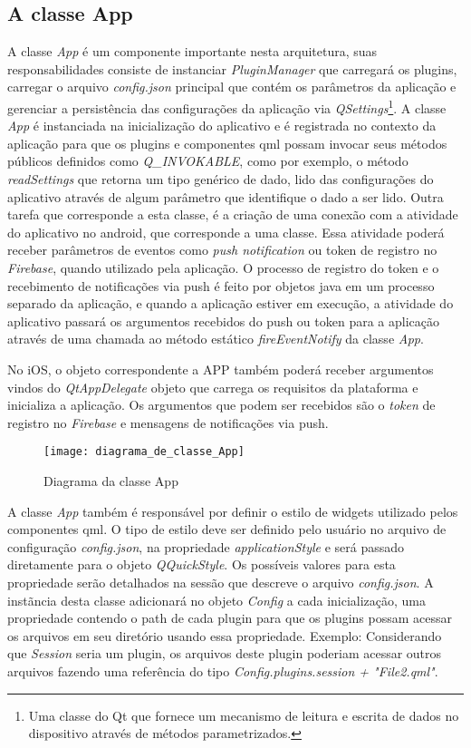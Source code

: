 \subsection{A classe App}\label{sec:solucao-desenvolvida}
A classe \textit{App} é um componente importante nesta arquitetura, suas responsabilidades consiste de instanciar \textit{PluginManager} que carregará os plugins, carregar o arquivo \textit{config.json} principal que contém os parâmetros da aplicação e gerenciar a persistência das configurações da aplicação via \textit{QSettings}\footnote{Uma classe do Qt que fornece um mecanismo de leitura e escrita de dados no dispositivo através de métodos parametrizados.}. A classe \textit{App} é instanciada na inicialização do aplicativo e é registrada no contexto da aplicação para que os plugins e componentes qml possam invocar seus métodos públicos definidos como \textit{Q\_INVOKABLE}, como por exemplo, o método \textit{readSettings} que retorna um tipo genérico de dado, lido das configurações do aplicativo através de algum parâmetro que identifique o dado a ser lido. Outra tarefa que corresponde a esta classe, é a criação de uma conexão com a atividade do aplicativo no android, que corresponde a uma classe. Essa atividade poderá receber parâmetros de eventos como \textit{push notification} ou token de registro no \textit{Firebase}, quando utilizado pela aplicação. O processo de registro do token e o recebimento de notificações via push é feito por objetos java em um processo separado da aplicação, e quando a aplicação estiver em execução, a atividade do aplicativo passará os argumentos recebidos do push ou token para a aplicação através de uma chamada ao método estático \textit{fireEventNotify} da classe \textit{App}.\par

No iOS, o objeto correspondente a APP também poderá receber argumentos vindos do \textit{QtAppDelegate} objeto que carrega os requisitos da plataforma e inicializa a aplicação. Os argumentos que podem ser recebidos são o \textit{token} de registro no \textit{Firebase} e mensagens de notificações via push.

\begin{figure}[h]
	\texttt{[image: diagrama\_de\_classe\_App]}
	\centering
	\caption{Diagrama da classe App}
\end{figure}

A classe \textit{App} também é responsável por definir o estilo de widgets utilizado pelos componentes qml. O tipo de estilo deve ser definido pelo usuário no arquivo de configuração \textit{config.json}, na propriedade \textit{applicationStyle} e será passado diretamente para o objeto \textit{QQuickStyle}. Os possíveis valores para esta propriedade serão detalhados na sessão que descreve o arquivo \textit{config.json}. A instãncia desta classe adicionará no objeto \textit{Config} a cada inicialização, uma propriedade contendo o path de cada plugin para que os plugins possam acessar os arquivos em seu diretório usando essa propriedade. Exemplo: Considerando que \textit{Session} seria um plugin, os arquivos deste plugin poderiam acessar outros arquivos fazendo uma referência do tipo \textit{Config.plugins.session + "File2.qml"}.


